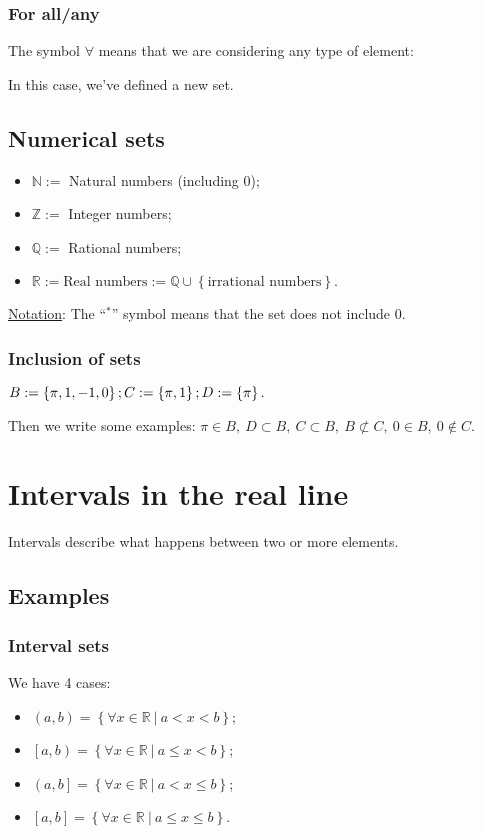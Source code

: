 \documentclass{article}
\newcommand{\figbox}[1]{ 
    \begin{figure*}[ht!]        
        \begin{center}            
            \fbox{#1}        
        \end{center}    
    \end{figure*}
}
\newcommand{\nots}{\underline{Notation}: }
\newcommand{\sht}{\ |\ }
\begin{document}
\subsubsection{For all/any}
The symbol $\forall$ means that we are considering any type of element:
\figbox{$\forall x \in \mathbb{R},\ x>0$}

In this case, we've defined a new set.

\subsection{Numerical sets}
\begin{itemize}
    \item $\mathbb{N} :=$ Natural numbers (including 0);
    \item $\mathbb{Z} :=$ Integer numbers;
    \item $\mathbb{Q} :=$ Rational numbers;
    \item $\mathbb{R} := \text{Real numbers} := \mathbb{Q} \cup \left\{\text{irrational numbers}\right\}.$
\end{itemize}

\nots{The ``$^*$'' symbol means that the set does not include 0.}

\subsubsection{Inclusion of sets}
\figbox{$\mathbb{N} \subset  \mathbb{Z} \subset \mathbb{Q} \subset \mathbb{R} \subset \mathbb{C}$}

$
    B := \left\{\pi, 1,-1,0\right\}; \\
    C := \left\{\pi, 1\right\}; \\
    D := \left\{\pi\right\}.
$

Then we write some examples: $\pi \in B,\ D \subset B,\ C \subset B,\ B \not\subset C,\ 0 \in B,\ 0 \notin C$.

\section{Intervals in the real line}
Intervals describe what happens between two or more elements.

\subsection{Examples}
\subsubsection{Interval sets}
We have 4 cases:
\begin{itemize}
    \item $(a,b) = \left\{\forall x \in \mathbb{R} \sht a<x<b\right\}$;
    \item $\left[a,b\right) = \left\{\forall x \in \mathbb{R} \sht a\leq x<b\right\}$;
    \item $\left(a,b\right] = \left\{\forall x \in \mathbb{R} \sht a<x\leq b\right\}$;
    \item $\left[a,b\right] = \left\{\forall x \in \mathbb{R} \sht a\leq x\leq b\right\}$.
\end{itemize}
\end{document}
